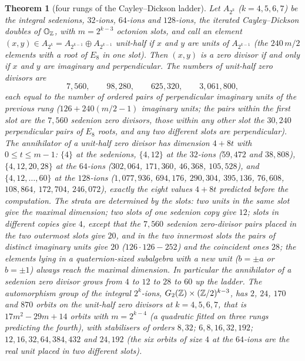 \documentclass[11pt]{amsart}
\newtheorem{theorem}{Theorem}[section]
\theoremstyle{definition}
\begin{document}
\begin{theorem}[four rungs of the Cayley--Dickson ladder]\label{thm:rungs}
Let $A_{2^k}$ ($k=4,5,6,7$) be the integral sedenions, $32$-ions, $64$-ions and $128$-ions, the iterated Cayley--Dickson doubles of $\mathbb O_{\mathbb{Z}}$, with $m=2^{k-3}$ octonion slots, and call an element $(x,y)\in A_{2^k}=A_{2^{k-1}}\oplus A_{2^{k-1}}$ unit-half if $x$ and $y$ are units of $A_{2^{k-1}}$ (the $240\,m/2$ elements with a root of $E_8$ in one slot). Then $(x,y)$ is a zero divisor if and only if $x$ and $y$ are imaginary and perpendicular. The numbers of unit-half zero divisors are
\[7{,}560,\qquad 98{,}280,\qquad 625{,}320,\qquad 3{,}061{,}800,\]
each equal to the number of ordered pairs of perpendicular imaginary units of the previous rung ($126+240(m/2-1)$ imaginary units; the pairs within the first slot are the $7{,}560$ sedenion zero divisors, those within any other slot the $30{,}240$ perpendicular pairs of $E_8$ roots, and any two different slots are perpendicular). The annihilator of a unit-half zero divisor has dimension $4+8t$ with $0\le t\le m-1$: $\{4\}$ at the sedenions, $\{4,12\}$ at the $32$-ions ($59{,}472$ and $38{,}808$), $\{4,12,20,28\}$ at the $64$-ions ($302{,}064$, $171{,}360$, $46{,}368$, $105{,}528$), and $\{4,12,\dots,60\}$ at the $128$-ions ($1{,}077{,}936$, $694{,}176$, $290{,}304$, $395{,}136$, $76{,}608$, $108{,}864$, $172{,}704$, $246{,}072$), exactly the eight values $4+8t$ predicted before the computation. The strata are determined by the slots: two units in the same slot give the maximal dimension; two slots of one sedenion copy give $12$; slots in different copies give $4$, except that the $7{,}560$ sedenion zero-divisor pairs placed in the two outermost slots give $20$, and in the two innermost slots the pairs of distinct imaginary units give $20$ ($126\cdot126-252$) and the coincident ones $28$; the elements lying in a quaternion-sized subalgebra with a new unit ($b=\pm a$ or $b=\pm1$) always reach the maximal dimension. In particular the annihilator of a sedenion zero divisor grows from $4$ to $12$ to $28$ to $60$ up the ladder. The automorphism group of the integral $2^k$-ions, $G_2(\mathbb{Z})\times(\mathbb{Z}/2)^{k-3}$, has $2$, $24$, $170$ and $870$ orbits on the unit-half zero divisors at $k=4,5,6,7$, that is $17m^2-29m+14$ orbits with $m=2^{k-4}$ (a quadratic fitted on three rungs predicting the fourth), with stabilisers of orders $8,32$; $6,8,16,32,192$; $12,16,32,64,384,432$ and $24{,}192$ (the six orbits of size $4$ at the $64$-ions are the real unit placed in two different slots).
\end{theorem}
\end{document}

